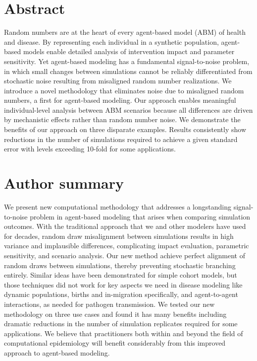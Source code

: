 \documentclass[10pt,letterpaper]{article}
\begin{document}
\section*{Abstract}
Random numbers are at the heart of every agent-based model (ABM) of health and disease. By representing each individual in a synthetic population, agent-based models enable detailed analysis of intervention impact and parameter sensitivity. Yet agent-based modeling has a fundamental signal-to-noise problem, in which small changes between simulations cannot be reliably differentiated from stochastic noise resulting from misaligned random number realizations. We introduce a novel methodology that eliminates noise due to misaligned random numbers, a first for agent-based modeling. Our approach enables meaningful individual-level analysis between ABM scenarios because all differences are driven by mechanistic effects rather than random number noise. We demonstrate the benefits of our approach on three disparate examples. Results consistently show reductions in the number of simulations required to achieve a given standard error with levels exceeding 10-fold for some applications.


\section*{Author summary}

We present new computational methodology that addresses a longstanding signal-to-noise problem in agent-based modeling that arises when comparing simulation outcomes. With the traditional approach that we and other modelers have used for decades, random draw misalignment between simulations results in high variance and implausible differences, complicating impact evaluation, parametric sensitivity, and scenario analysis. Our new method achieve perfect alignment of random draws between simulations, thereby preventing stochastic branching entirely. Similar ideas have been demonstrated for simple cohort models, but those techniques did not work for key aspects we need in disease modeling like dynamic populations, births and in-migration specifically, and agent-to-agent interactions, as needed for pathogen transmission. We tested our new methodology on three use cases and found it has many benefits including dramatic reductions in the number of simulation replicates required for some applications. We believe that practitioners both within and beyond the field of computational epidemiology will benefit considerably from this improved approach to agent-based modeling.
\end{document}

